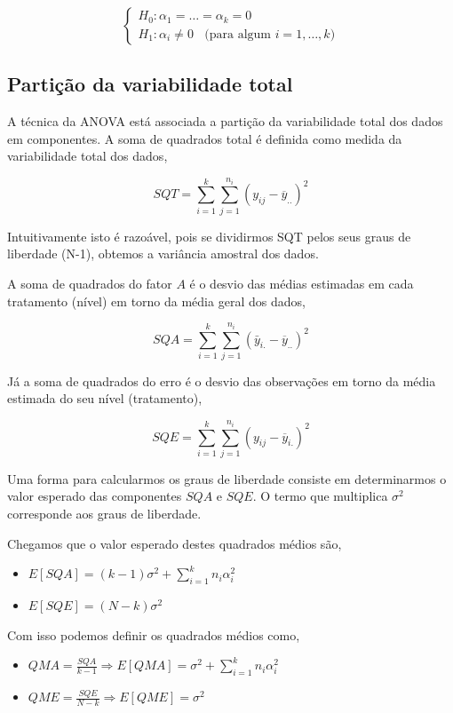 \documentclass[
]{book}
\providecommand{\tightlist}{%
  \setlength{\itemsep}{0pt}\setlength{\parskip}{0pt}}
\begin{document}
\[
\begin{cases} 
H_0: \alpha_1=\ldots=\alpha_k=0 \\
H_1:\alpha_i\neq 0~~~~\text{(para algum }i=1,\ldots,k\text{)}
\end{cases}
\]

\hypertarget{partiuxe7uxe3o-da-variabilidade-total}{%
\subsection{Partição da variabilidade total}\label{partiuxe7uxe3o-da-variabilidade-total}}

A técnica da ANOVA está associada a partição da variabilidade total dos dados em componentes. A soma de quadrados total é definida como medida da variabilidade total dos dados,

\[SQT=\sum_{i=1}^{k}\sum_{j=1}^{n_{i}}(y_{ij} - \overline{y}_{..})^{2}\]

Intuitivamente isto é razoável, pois se dividirmos SQT pelos seus graus de liberdade (N-1), obtemos a variância amostral dos dados.

A soma de quadrados do fator \(A\) é o desvio das médias estimadas em cada tratamento (nível) em torno da média geral dos dados,

\[SQA=\sum_{i=1}^{k}\sum_{j=1}^{n_{i}}(\bar y_{i.} - \overline{y}_{..})^{2}\]

Já a soma de quadrados do erro é o desvio das observações em torno da média estimada do seu nível (tratamento),

\[SQE=\sum_{i=1}^{k}\sum_{j=1}^{n_{i}}(y_{ij} - \overline{y}_{i.})^{2}\]

Uma forma para calcularmos os graus de liberdade consiste em determinarmos o valor esperado das componentes \(SQA\) e \(SQE\). O termo que multiplica \(\sigma^2\) corresponde aos graus de liberdade.

Chegamos que o valor esperado destes quadrados médios são,

\begin{itemize}
\tightlist
\item
  \(E[SQA]=(k-1)\sigma^2+\sum_{i=1}^{k} n_i\alpha_i^2\)
\item
  \(E[SQE]=(N-k)\sigma^2\)
\end{itemize}

Com isso podemos definir os quadrados médios como,

\begin{itemize}
\tightlist
\item
  \(QMA=\frac{SQA}{k-1}\Longrightarrow E[QMA]=\sigma^2+\sum_{i=1}^{k} n_i\alpha_i^2\)
\item
  \(QME=\frac{SQE}{N-k}\Longrightarrow E[QME]=\sigma^2\)
\end{itemize}
\end{document}
